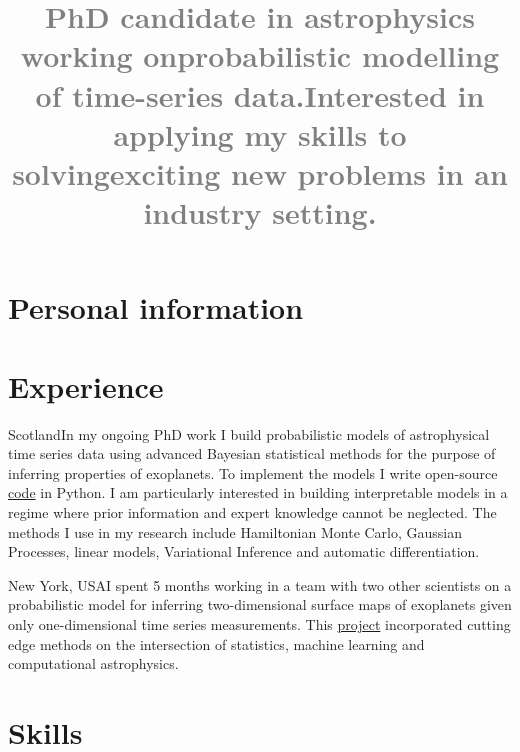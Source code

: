 \documentclass[11pt,a4paper,roman, colorlinks,linkcolor=true]{moderncv}
\title{\textcolor{gray}{ \normalsize PhD candidate in astrophysics 
working on\newline probabilistic modelling of time-series data.\newline Interested 
in applying my skills to solving\newline exciting new problems in an industry setting.}}
\begin{document}
\renewcommand*{\titlefont}{\fontsize{14}{18}\mdseries\upshape}
\makecvtitle
\section{Personal information}

\hypersetup{urlcolor=links}
\section{Experience}
{Scotland}{}{In my ongoing PhD work I build probabilistic models of astrophysical time series data 
using advanced Bayesian statistical methods for the purpose of inferring properties of exoplanets.
To implement the models I write open-source \href{https://caustic.readthedocs.io/en/latest/}{code} in \textsf{Python}.
I am particularly interested in building interpretable models in a regime where prior information and expert knowledge cannot be neglected.
The methods I use in my research include Hamiltonian Monte Carlo, Gaussian Processes, linear models, Variational Inference and automatic differentiation.}

{New York, USA}{}{I spent 5 months working in a team with two other scientists on a probabilistic model for inferring two-dimensional surface maps of exoplanets given only one-dimensional time series measurements.
This \href{https://github.com/fbartolic/volcano/blob/master-pdf/paper/paper.pdf}{project} incorporated cutting edge methods on the intersection of statistics, machine learning and computational astrophysics.}

\section{Skills}
\end{document}
